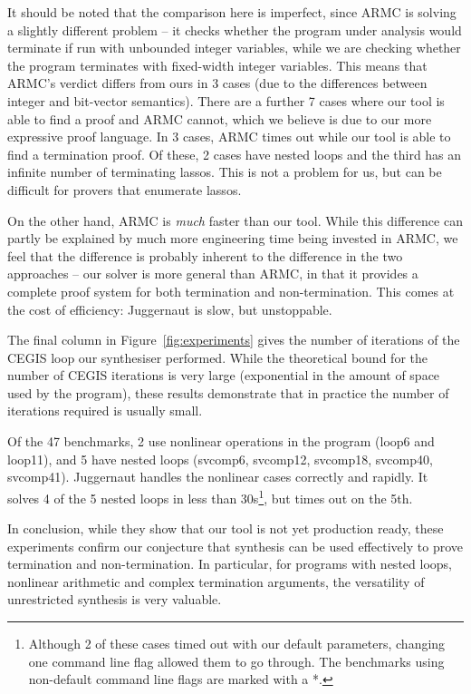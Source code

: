 \documentclass[preprint]{sigplanconf}
\theoremstyle{definition}
\begin{document}
It should be noted that the comparison here is imperfect, since {\sc ARMC}
is solving a slightly different problem -- it checks whether the program
under analysis would terminate if run with unbounded integer variables,
while we are checking whether the program terminates with fixed-width
integer variables.  This means that {\sc ARMC}'s verdict differs from ours
in 3 cases (due to the differences between integer and bit-vector
semantics).  There are a further 7 cases where our tool is able to find a
proof and {\sc ARMC} cannot, which we believe is due to our more expressive
proof language.  In 3 cases, {\sc ARMC} times out while our tool is able to
find a termination proof.  Of these, 2 cases have nested loops and the
third has an infinite number of terminating lassos.  This is not a problem for us,
but can be difficult for provers that enumerate lassos.

On the other hand, {\sc ARMC} is \emph{much} faster than our tool.  While
this difference can partly be explained by much more engineering time being
invested in {\sc ARMC}, we feel that the difference is probably inherent to
the difference in the two approaches -- our solver is more general
than {\sc ARMC}, in that it provides a complete proof system for both
termination and non-termination.  This comes at the cost of efficiency:
{\sc Juggernaut} is slow, but unstoppable.

The final column in Figure~\ref{fig:experiments} gives the number of
iterations of the CEGIS loop our synthesiser performed.  While the
theoretical bound for the number of CEGIS iterations is very large
(exponential in the amount of space used by the program), these results
demonstrate that in practice the number of iterations required is usually
small.

Of the 47 benchmarks, 2 use nonlinear operations in the program (loop6 and loop11),
and 5 have nested loops (svcomp6, svcomp12, svcomp18, svcomp40, svcomp41).
{\sc Juggernaut} handles the nonlinear cases correctly and rapidly.
It solves 4 of the 5 nested loops in less than 30s\footnote{Although
2 of these cases timed out with our default parameters, changing one command
line flag allowed them to go through.  The benchmarks using non-default
command line flags are marked with a *.}, but times out on the 5th.

In conclusion, while they show that our tool is not yet production ready,
these experiments confirm our conjecture that synthesis can be used
effectively to prove termination and non-termination.  In particular,
for programs with nested loops, nonlinear arithmetic and complex
termination arguments, the versatility of unrestricted synthesis
is very valuable.
\end{document}
